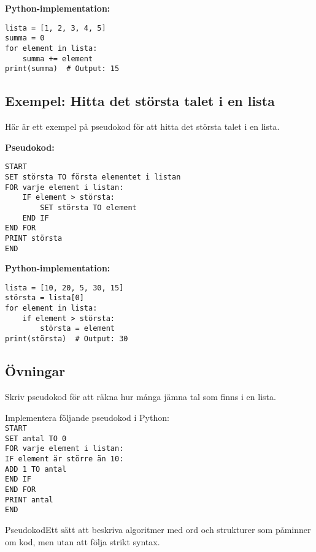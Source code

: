 \textbf{Python-implementation:}
\begin{lstlisting}[title=Summera en lista]
lista = [1, 2, 3, 4, 5]
summa = 0
for element in lista:
    summa += element
print(summa)  # Output: 15
\end{lstlisting}

\subsection{Exempel: Hitta det största talet i en lista}
Här är ett exempel på pseudokod för att hitta det största talet i en lista.

\textbf{Pseudokod:}
\begin{verbatim}
START
SET största TO första elementet i listan
FOR varje element i listan:
    IF element > största:
        SET största TO element
    END IF
END FOR
PRINT största
END
\end{verbatim}

\textbf{Python-implementation:}
\begin{lstlisting}[title=Hitta största talet i en lista]
lista = [10, 20, 5, 30, 15]
största = lista[0]
for element in lista:
    if element > största:
        största = element
print(största)  # Output: 30
\end{lstlisting}

\subsection{Övningar}
\begin{exercise}
Skriv pseudokod för att räkna hur många jämna tal som finns i en lista.
\end{exercise}

\begin{exercise}
Implementera följande pseudokod i Python: \\
\texttt{START \\
SET antal TO 0 \\
FOR varje element i listan: \\
    IF element är större än 10: \\
        ADD 1 TO antal \\
    END IF \\
END FOR \\
PRINT antal \\
END}
\end{exercise}

\begin{rconceptbox}{Pseudokod}{Ett sätt att beskriva algoritmer med ord och strukturer som påminner om kod, men utan att följa strikt syntax.}
\end{rconceptbox}

